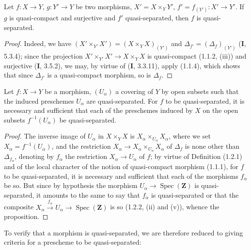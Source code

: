 \begin{proposition}[1.2.5]
\label{IV.1.2.5}
Let $f:X\to Y$, $g:Y'\to Y$ be two morphisms,
$X'=X\times_Y Y'$, $f'=f_{(Y')}:X'\to Y'$. If $g$ is quasi-compact and
surjective and $f'$ quasi-separated, then $f$ is quasi-separated.
\end{proposition}

\begin{proof}
Indeed, we have $(X'\times_{Y'}X')=(X\times_YX)_{(Y')}$ and
$\Delta_{f'}=(\Delta_f)_{(Y')}$ (\textbf{I}, 5.3.4); since the projection
$X'\times_{Y'}X'\to X\times_YX$ is quasi-compact (1.1.2, (iii)) and
surjective (\textbf{I}, 3.5.2), we may, by virtue of (\textbf{I}, 3.3.11), apply (1.1.4),
which shows that since $\Delta_{f'}$ is a quasi-compact morphism, so is
$\Delta_f$.
\end{proof}

\begin{proposition}[1.2.6]
\label{IV.1.2.6}
Let $f:X\to Y$ be a morphism, $(U_\alpha)$ a covering of $Y$ by open
subsets such that the induced preschemes $U_\alpha$ are quasi-separated. For
$f$ to be quasi-separated, it is necessary and sufficient that each of the
preschemes induced by $X$ on the open subsets $f^{-1}(U_\alpha)$ be
quasi-separated.
\end{proposition}

\begin{proof}
The inverse image of $U_\alpha$ in $X\times_YX$ is
$X_\alpha\times_{U_\alpha}X_\alpha$, where we set
$X_\alpha=f^{-1}(U_\alpha)$, and the restriction
$X_\alpha\to X_\alpha\times_{U_\alpha}X_\alpha$ of $\Delta_f$ is none other
than $\Delta_{f_\alpha}$, denoting by $f_\alpha$ the restriction
$X_\alpha\to U_\alpha$ of $f$; by virtue of Definition (1.2.1) and of the
local character of the notion of quasi-compact morphism (1.1.1), for $f$
to be quasi-separated, it is necessary and sufficient that each of the
morphisms $f_\alpha$ be so. But since by hypothesis the morphism
$U_\alpha\to\operatorname{Spec}(\mathbf Z)$ is quasi-separated, it amounts to
the same to say that $f_\alpha$ is quasi-separated or that the composite
$X_\alpha\xrightarrow{f_\alpha}U_\alpha\to\operatorname{Spec}(\mathbf Z)$
is so (1.2.2, (ii) and (v)), whence the proposition.
\end{proof}


To verify that a morphism is quasi-separated, we are therefore reduced to
giving criteria for a prescheme to be quasi-separated:

